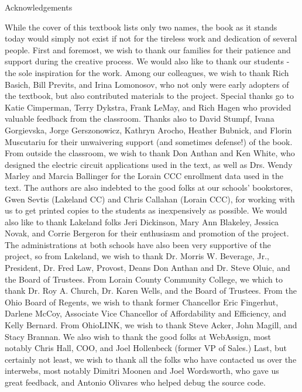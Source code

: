 \centerline{ {\sc Acknowledgements}}

\bigskip


While the cover of this textbook lists only two names, the book as it stands today would simply not exist if not for the tireless work and dedication of several people. First and foremost, we wish to thank our families for their patience and support during the creative process.  We would also like to thank our students  - the sole inspiration for the work.  Among our colleagues, we wish to thank Rich Basich, Bill Previts, and  Irina Lomonosov, who not only were early adopters of the textbook, but also contributed materials to the project. Special thanks go to Katie Cimperman, Terry Dykstra, Frank LeMay, and Rich Hagen who provided valuable feedback from the classroom. Thanks also to David Stumpf, Ivana Gorgievska, Jorge Gerszonowicz,  Kathryn Arocho, Heather Bubnick, and Florin Muscutariu for their unwaivering support (and sometimes defense!) of the book.  From outside the classroom, we wish to thank Don Anthan and Ken White, who designed the electric circuit applications used in the text, as well as Drs. Wendy Marley and  Marcia Ballinger for the Lorain CCC enrollment data used in the text.  The authors are also indebted to the good folks at our schools' bookstores, Gwen Sevtis (Lakeland CC) and Chris Callahan (Lorain CCC), for working with us to get printed copies to the students as inexpensively as possible. We would also like to thank Lakeland folks Jeri Dickinson, Mary Ann Blakeley, Jessica Novak, and Corrie Bergeron for their enthusiasm and promotion of the project.  The administrations at both schools have also been very supportive of the project, so from Lakeland, we wish to thank Dr. Morris W. Beverage, Jr., President, Dr. Fred Law, Provost, Deans Don Anthan and Dr. Steve Oluic, and the Board of Trustees.  From Lorain County Community College, we which to thank Dr. Roy A. Church, Dr. Karen Wells, and the Board of Trustees.  From the Ohio Board of Regents, we wish to thank former Chancellor Eric Fingerhut, Darlene McCoy, Associate Vice Chancellor of Affordability and Efficiency, and  Kelly Bernard.  From OhioLINK, we wish to thank Steve Acker, John Magill, and Stacy Brannan.  We also wish to thank the good folks at WebAssign, most notably Chris Hall, COO, and Joel Hollenbeck (former VP of Sales.) Last, but certainly not least, we wish to thank all the folks who have contacted us over the interwebs, most notably Dimitri Moonen and Joel Wordsworth, who gave us great feedback, and Antonio Olivares who helped debug the source code.